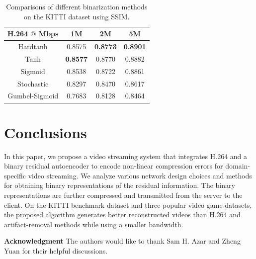 \documentclass[letterpaper]{article} %
\begin{document}
	\begin{table}[t]
		\caption{Comparisons of different binarization methods on the KITTI dataset using SSIM.
		}
		\centering   
		\begin{tabular}{cccc}
			\toprule
			H.264 $@$ Mbps & 1M & 2M & 5M \\
			\hline
			
			Hardtanh & 0.8575 & \textbf{0.8773} & \textbf{0.8901} \\
			\hline
			
			Tanh & \textbf{0.8577} & 0.8770 & 0.8882 \\
			\hline
			
			Sigmoid & 0.8538 & 0.8722 & 0.8861 \\
			\hline
			
			Stochastic & 0.8297 & 0.8470 & 0.8617 \\
			\hline
			
			Gumbel-Sigmoid & 0.7683 & 0.8128 & 0.8464 \\
			\bottomrule
		\end{tabular}
		\label{tab:binary_ssim}
	\end{table}
	
	
	
	\section{Conclusions}
	In this paper, we propose a video streaming system that integrates H.264 and a binary residual autoencoder to encode non-linear compression errors for domain-specific video streaming. We analyze various network design choices and methods for obtaining binary representations of the residual information. The binary representations are further compressed and transmitted from the server to the client. On the KITTI benchmark dataset and three popular video game datasets, the proposed algorithm generates better reconstructed videos than H.264 and artifact-removal methods while using a smaller bandwidth.
	
	{\bf \noindent Acknowledgment} The authors would like to thank Sam H. Azar and Zheng Yuan for their helpful discussions.
	
	
	
\end{document}
